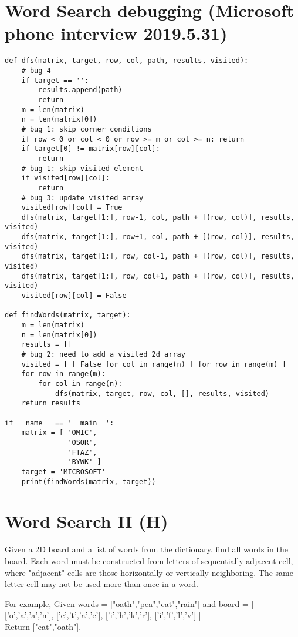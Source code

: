 \section{Word Search debugging (Microsoft phone interview 2019.5.31)}
\begin{lstlisting}
def dfs(matrix, target, row, col, path, results, visited):
    # bug 4
    if target == '':
        results.append(path)
        return
    m = len(matrix)
    n = len(matrix[0])
    # bug 1: skip corner conditions
    if row < 0 or col < 0 or row >= m or col >= n: return
    if target[0] != matrix[row][col]:
        return
    # bug 1: skip visited element
    if visited[row][col]:
        return
    # bug 3: update visited array
    visited[row][col] = True
    dfs(matrix, target[1:], row-1, col, path + [(row, col)], results, visited)
    dfs(matrix, target[1:], row+1, col, path + [(row, col)], results, visited)
    dfs(matrix, target[1:], row, col-1, path + [(row, col)], results, visited)
    dfs(matrix, target[1:], row, col+1, path + [(row, col)], results, visited)
    visited[row][col] = False

def findWords(matrix, target):
    m = len(matrix)
    n = len(matrix[0])
    results = []
    # bug 2: need to add a visited 2d array
    visited = [ [ False for col in range(n) ] for row in range(m) ]
    for row in range(m):
        for col in range(n):
            dfs(matrix, target, row, col, [], results, visited)
    return results

if __name__ == '__main__':
    matrix = [ 'OMIC',
               'OSOR',
               'FTAZ',
               'BYWK' ]
    target = 'MICROSOFT'
    print(findWords(matrix, target))
\end{lstlisting}

\section{Word Search II (H)}
Given a 2D board and a list of words from the dictionary, find all words in the board. Each word must be constructed from letters of sequentially adjacent cell, where "adjacent" cells are those horizontally or vertically neighboring. The same letter cell may not be used more than once in a word.

For example,
Given words = ["oath","pea","eat","rain"] and board =
[
  ['o','a','a','n'],
  ['e','t','a','e'],
  ['i','h','k','r'],
  ['i','f','l','v']
]\\

Return ["eat","oath"].\\

